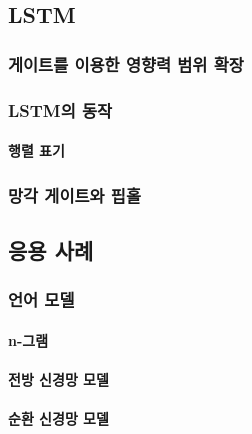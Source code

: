 \documentclass [12pt] {oblivoir}
\let\oldsubsubsection=\subsubsection
\renewcommand{\subsubsection}
{
  \filbreak
  \oldsubsubsection
}
\begin{document}
\subsection{LSTM}

\subsubsection{게이트를 이용한 영향력 범위 확장}

\subsubsection{LSTM의 동작}

\paragraph*{행렬 표기}\mbox{}

\vspace{3mm}

\subsubsection{망각 게이트와 핍홀}

\subsection{응용 사례}

\subsubsection{언어 모델}

\paragraph*{n-그램}\mbox{}

\vspace{3mm}

\paragraph*{전방 신경망 모델}\mbox{}

\vspace{3mm}

\paragraph*{순환 신경망 모델}\mbox{}
\end{document}
